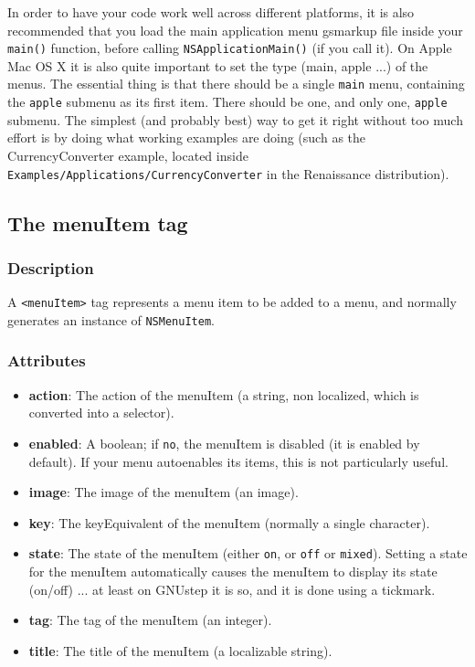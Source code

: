 In order to have your code work well across different platforms, it is
also recommended that you load the main application menu gsmarkup file
inside your \texttt{main()} function, before calling
\texttt{NSApplicationMain()} (if you call it).  On Apple Mac OS X it is
also quite important to set the type (main, apple ...)  of the menus.
The essential thing is that there should be a single \texttt{main}
menu, containing the \texttt{apple} submenu as its first item.  There
should be one, and only one, \texttt{apple} submenu.  The simplest
(and probably best) way to get it right without too much effort is by
doing what working examples are doing (such as the CurrencyConverter
example, located inside
\texttt{Examples/Applications/CurrencyConverter} in the Renaissance
distribution).

\subsection{The menuItem tag}

\subsubsection{Description}
A \texttt{<menuItem>} tag represents a menu item to be added to a menu,
and normally generates an instance of \texttt{NSMenuItem}.

\subsubsection{Attributes}
\begin{itemize}
\item {\bf action}: The action of the menuItem (a string, non
  localized, which is converted into a selector).
\item {\bf enabled}: A boolean; if \texttt{no}, the menuItem is
  disabled (it is enabled by default).  If your menu autoenables its
  items, this is not particularly useful.
\item {\bf image}: The image of the menuItem (an image).
\item {\bf key}: The keyEquivalent of the menuItem (normally a single
  character).
\item {\bf state}: The state of the menuItem (either \texttt{on}, or
  \texttt{off} or \texttt{mixed}).  Setting a state for the menuItem
  automatically causes the menuItem to display its state (on/off)
  ... at least on GNUstep it is so, and it is done using a tickmark.
\item {\bf tag}: The tag of the menuItem (an integer).
\item {\bf title}: The title of the menuItem (a localizable string).
\end{itemize}

